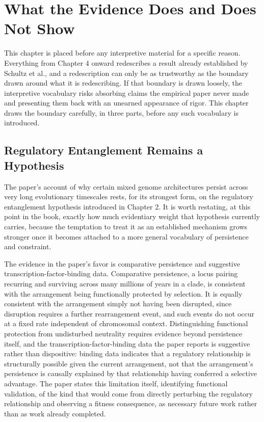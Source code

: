 \documentclass[11pt]{book}
\begin{document}
\chapter{What the Evidence Does and Does Not Show}

This chapter is placed before any interpretive material for a specific reason. Everything from Chapter 4 onward redescribes a result already established by Schultz et al., and a redescription can only be as trustworthy as the boundary drawn around what it is redescribing. If that boundary is drawn loosely, the interpretive vocabulary risks absorbing claims the empirical paper never made and presenting them back with an unearned appearance of rigor. This chapter draws the boundary carefully, in three parts, before any such vocabulary is introduced.

\section{Regulatory Entanglement Remains a Hypothesis}

The paper's account of why certain mixed genome architectures persist across very long evolutionary timescales rests, for its strongest form, on the regulatory entanglement hypothesis introduced in Chapter 2. It is worth restating, at this point in the book, exactly how much evidentiary weight that hypothesis currently carries, because the temptation to treat it as an established mechanism grows stronger once it becomes attached to a more general vocabulary of persistence and constraint.

The evidence in the paper's favor is comparative persistence and suggestive transcription-factor-binding data. Comparative persistence, a locus pairing recurring and surviving across many millions of years in a clade, is consistent with the arrangement being functionally protected by selection. It is equally consistent with the arrangement simply not having been disrupted, since disruption requires a further rearrangement event, and such events do not occur at a fixed rate independent of chromosomal context. Distinguishing functional protection from undisturbed neutrality requires evidence beyond persistence itself, and the transcription-factor-binding data the paper reports is suggestive rather than dispositive: binding data indicates that a regulatory relationship is structurally possible given the current arrangement, not that the arrangement's persistence is causally explained by that relationship having conferred a selective advantage. The paper states this limitation itself, identifying functional validation, of the kind that would come from directly perturbing the regulatory relationship and observing a fitness consequence, as necessary future work rather than as work already completed.
\end{document}
